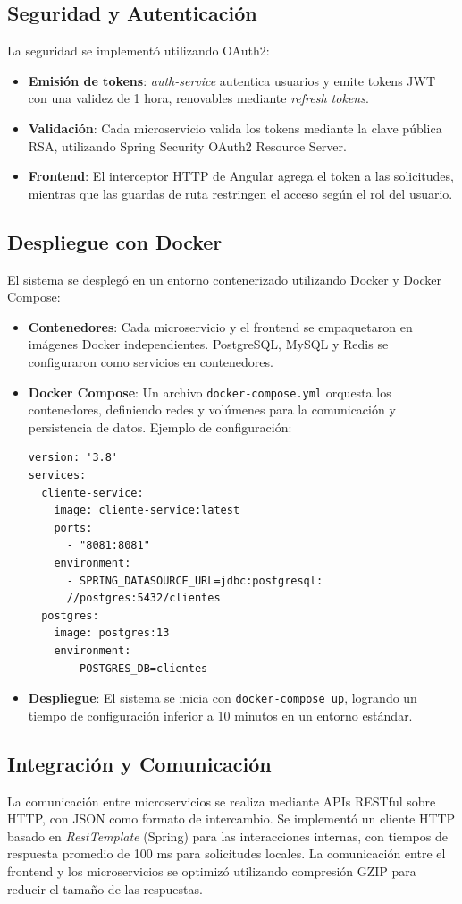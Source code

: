 \documentclass[a4paper,12pt]{article}
\begin{document}
\subsection{Seguridad y Autenticación}
La seguridad se implementó utilizando OAuth2:
\begin{itemize}
    \item \textbf{Emisión de tokens}: \textit{auth-service} autentica usuarios y emite tokens JWT con una validez de 1 hora, renovables mediante \textit{refresh tokens}.
    \item \textbf{Validación}: Cada microservicio valida los tokens mediante la clave pública RSA, utilizando Spring Security OAuth2 Resource Server.
    \item \textbf{Frontend}: El interceptor HTTP de Angular agrega el token a las solicitudes, mientras que las guardas de ruta restringen el acceso según el rol del usuario.
\end{itemize}

\subsection{Despliegue con Docker}
El sistema se desplegó en un entorno contenerizado utilizando Docker y Docker Compose:
\begin{itemize}
    \item \textbf{Contenedores}: Cada microservicio y el frontend se empaquetaron en imágenes Docker independientes. PostgreSQL, MySQL y Redis se configuraron como servicios en contenedores.
    \item \textbf{Docker Compose}: Un archivo \texttt{docker-compose.yml} orquesta los contenedores, definiendo redes y volúmenes para la comunicación y persistencia de datos. Ejemplo de configuración:
    \begin{verbatim}
version: '3.8'
services:
  cliente-service:
    image: cliente-service:latest
    ports:
      - "8081:8081"
    environment:
      - SPRING_DATASOURCE_URL=jdbc:postgresql:
      //postgres:5432/clientes
  postgres:
    image: postgres:13
    environment:
      - POSTGRES_DB=clientes
    \end{verbatim}
    \item \textbf{Despliegue}: El sistema se inicia con \texttt{docker-compose up}, logrando un tiempo de configuración inferior a 10 minutos en un entorno estándar.
\end{itemize}

\subsection{Integración y Comunicación}
La comunicación entre microservicios se realiza mediante APIs RESTful sobre HTTP, con JSON como formato de intercambio. Se implementó un cliente HTTP basado en \textit{RestTemplate} (Spring) para las interacciones internas, con tiempos de respuesta promedio de 100 ms para solicitudes locales. La comunicación entre el frontend y los microservicios se optimizó utilizando compresión GZIP para reducir el tamaño de las respuestas.
\end{document}
